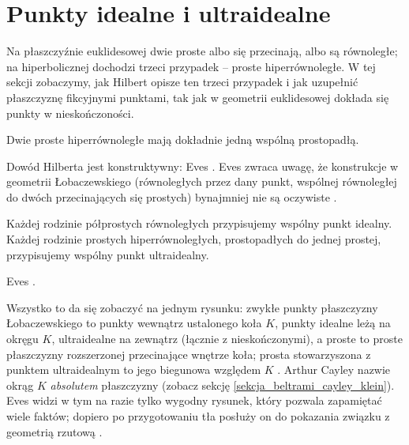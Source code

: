 \section{Punkty idealne i ultraidealne} %
\label{sekcja_punkty_idealne}

Na płaszczyźnie euklidesowej dwie proste albo się przecinają, albo są równoległe; na hiperbolicznej dochodzi trzeci przypadek -- proste hiperrównoległe. %
W tej sekcji zobaczymy, jak Hilbert opisze ten trzeci przypadek i jak uzupełnić płaszczyznę fikcyjnymi punktami, tak jak w geometrii euklidesowej dokłada się punkty w nieskończoności. %

\begin{theorem}
[Hilberta] %
	Dwie proste hiperrównoległe mają dokładnie jedną wspólną prostopadłą. %
\end{theorem}

Dowód Hilberta jest konstruktywny: Eves \cite[s. 305--306]{eves1_1972}. %
Eves zwraca uwagę, że konstrukcje w geometrii Łobaczewskiego (równoległych przez dany punkt, wspólnej równoległej do dwóch przecinających się prostych) bynajmniej nie są oczywiste \cite[s. 306]{eves1_1972}. %
%

\begin{definition}
	Każdej rodzinie półprostych równoległych przypisujemy wspólny punkt idealny. %
	Każdej rodzinie prostych hiperrównoległych, prostopadłych do jednej prostej, przypisujemy wspólny punkt ultraidealny. %
\end{definition}

Eves \cite[s. 306]{eves1_1972}. %

Wszystko to da się zobaczyć na jednym rysunku: zwykłe punkty płaszczyzny Łobaczewskiego to punkty wewnątrz ustalonego koła $K$, punkty idealne leżą na okręgu $K$, ultraidealne na zewnątrz (łącznie z nieskończonymi), a proste to proste płaszczyzny rozszerzonej przecinające wnętrze koła; prosta stowarzyszona z punktem ultraidealnym to jego biegunowa względem $K$ \cite[s. 306--307]{eves1_1972}. %
Arthur Cayley nazwie okrąg $K$ \emph{absolutem} płaszczyzny (zobacz sekcję \ref{sekcja_beltrami_cayley_klein}). %
Eves widzi w tym na razie tylko wygodny rysunek, który pozwala zapamiętać wiele faktów; dopiero po przygotowaniu tła posłuży on do pokazania związku z geometrią rzutową \cite[s. 307]{eves1_1972}. %

